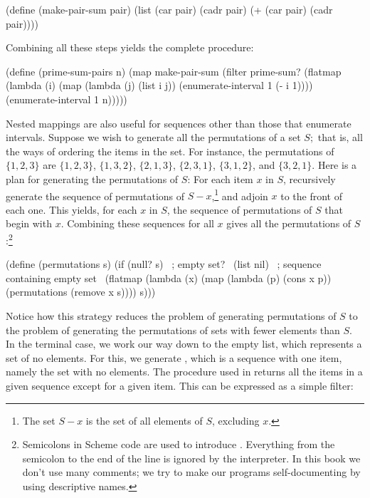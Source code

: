 \begin{codeBlock}
(define (make-pair-sum pair)
  (list (car pair) (cadr pair) (+ (car pair)
                                  (cadr pair))))
\end{codeBlock}

\noindent
Combining all these steps yields the complete procedure:

\begin{compactCodeBlock}
(define (prime-sum-pairs n)
  (map make-pair-sum
       (filter prime-sum? (flatmap
                           (lambda (i)
                             (map (lambda (j) (list i j))
                                  (enumerate-interval
                                    1
                                    (- i 1))))
                           (enumerate-interval 1 n)))))
\end{compactCodeBlock}

\noindent
Nested mappings are also useful for sequences other than those that enumerate
intervals.  Suppose we wish to generate all the permutations of a set \( S; \)
that is, all the ways of ordering the items in the set.  For instance, the
permutations of \( \{1, 2, 3\} \) are \( \{1, 2, 3\} \), \( \{1, 3, 2\} \), \( \{2, 1, 3\} \), \( \{2, 3, 1\} \),
\( \{3, 1, 2\} \), and \( \{3, 2, 1\} \).  Here is a plan for generating the permutations of
\( S \): For each item \( x \) in \( S \), recursively generate the sequence of
permutations of \( S - x \),\footnote{The set \( S - x \) is the set of all
elements of \( S \), excluding \( x \).} and adjoin \( x \) to the front of each one.
This yields, for each \( x \) in \( S \), the sequence of permutations of \( S \)
that begin with \( x \).  Combining these sequences for all \( x \) gives all the
permutations of \( S \):\footnote{Semicolons in Scheme code are used to introduce
.  Everything from the semicolon to the end of the line is
ignored by the interpreter.  In this book we don't use many comments; we try to
make our programs self-documenting by using descriptive names.}

\begin{codeBlock}
(define (permutations s)
  (if (null? s)              ~\textrm{; empty set?}~
      (list nil)             ~\textrm{; sequence containing empty set}~
      (flatmap (lambda (x)
                 (map (lambda (p) (cons x p))
                      (permutations (remove x s))))
               s)))
\end{codeBlock}

\noindent
Notice how this strategy reduces the problem of generating permutations of
\( S \) to the problem of generating the permutations of sets with fewer elements
than \( S \).  In the terminal case, we work our way down to the empty list,
which represents a set of no elements.  For this, we generate , which is a sequence with one item, namely the set with no elements.  The
 procedure used in  returns all the items in a
given sequence except for a given item.  This can be expressed as a simple
filter:

